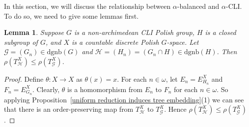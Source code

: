 \documentclass[11pt]{amsart}
\newtheorem{lemma}[theorem]{Lemma}
\theoremstyle{definition}
\theoremstyle{remark}
\numberwithin{equation}{section}
\def\dgnb{{\mathrm{dgnb}}}
\def\hier#1{$#1$-CLI}
\def\otr#1#2{T_{\mathcal{#1}}^{#2}}
\begin{document}
In this section, we will discuss the relationship between $\alpha$-balanced and \hier\alpha. To do so, we need to give some lemmas first.

\begin{lemma}\label{subaction induced orbit tree}
    Suppose $G$ is a non-archimedean CLI Polish group, $H$ is a closed subgroup of $G$, and $X$ is a countable discrete Polish $G$-space.
    Let $\mathcal{G}=(G_n)\in\dgnb(G)$ and $\mathcal{H}=(H_n)=(G_n\cap H)\in\dgnb(H)$. Then $\rho(T_\mathcal{H}^X)\leq\rho(T_\mathcal{G}^X)$.
\end{lemma}

\begin{proof}
    Define $\theta:X\to X$ as $\theta(x)=x$. For each $n\in\omega$, let $E_n=E_{H_n}^X$ and $F_n=E_{G_n}^X$. Clearly, $\theta$ is a homomorphism from $E_n$ to $F_n$ for each $n\in\omega$. So applying Proposition~\ref{uniform reduction induces tree embedding}(1) we can see that there is an order-preserving map from $\otr{H}{X}$ to $\otr{G}{X}$. Hence $\rho(T_\mathcal{H}^X)\leq\rho(T_\mathcal{G}^X)$.
\end{proof}
\end{document}
